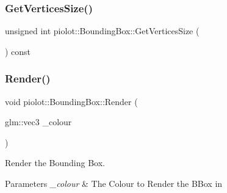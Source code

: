 \mbox{\label{group___getters_ga57651f343f21133fc6c89c8c5619ed84}} 
\subsubsection{\texorpdfstring{Get\+Vertices\+Size()}{GetVerticesSize()}}
{\footnotesize\ttfamily unsigned int piolot\+::\+Bounding\+Box\+::\+Get\+Vertices\+Size (\begin{DoxyParamCaption}{ }\end{DoxyParamCaption}) const\hspace{0.3cm}{\ttfamily [inline]}}

\mbox{\label{group___getters_ga3ef9f966674be7fa0448d388b7a3d776}} 
\subsubsection{\texorpdfstring{Render()}{Render()}}
{\footnotesize\ttfamily void piolot\+::\+Bounding\+Box\+::\+Render (\begin{DoxyParamCaption}\item[{glm\+::vec3}]{\+\_\+colour }\end{DoxyParamCaption})}



Render the Bounding Box. 


\begin{DoxyParams}{Parameters}
{\em \+\_\+colour} & The Colour to Render the B\+Box in \\
\hline
\end{DoxyParams}
